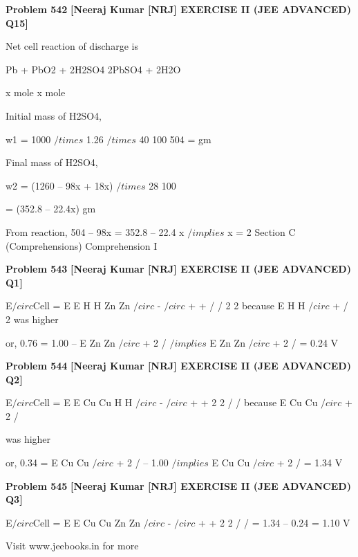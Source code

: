 \begin{problembox}
\textbf{Problem 542} \hfill \textbf{[Neeraj Kumar [NRJ] EXERCISE II (JEE ADVANCED) Q15]}
\label{q:ext-nrj_all_questions-542}

Net cell reaction of discharge is
 
 Pb + PbO2 + 2H2SO4 
 2PbSO4 + 2H2O
 
                          x mole                               x mole
 
 Initial mass of H2SO4,
 
  
 w1 = 1000 $/times$ 1.26 $/times$ 40
100
504
=
gm
 
 Final mass of H2SO4,
 
  
 w2 = (1260 -- 98x + 18x) $/times$ 28
100
 
  
      = (352.8 -- 22.4x) gm
 
 From reaction, 504 -- 98x = 352.8 -- 22.4 x $/implies$ x = 2
Section C (Comprehensions)
Comprehension I
\end{problembox}

\begin{problembox}
\textbf{Problem 543} \hfill \textbf{[Neeraj Kumar [NRJ] EXERCISE II (JEE ADVANCED) Q1]}
\label{q:ext-nrj_all_questions-543}

E$/circ$Cell = E
E
H
H
Zn
Zn
$/circ$
-
$/circ$
+
+
/
/
2
2
 because E H
H
$/circ$
+ /
2 was 
higher
 
 or, 0.76 = 1.00 -- E Zn
Zn
$/circ$
+
2 /
 $/implies$ E Zn
Zn
$/circ$
+
2 /
 = 0.24 V
\end{problembox}

\begin{problembox}
\textbf{Problem 544} \hfill \textbf{[Neeraj Kumar [NRJ] EXERCISE II (JEE ADVANCED) Q2]}
\label{q:ext-nrj_all_questions-544}

E$/circ$Cell = E
E
Cu
Cu
H
H
$/circ$
-
$/circ$
+
+
2
2
/
/
 because E Cu
Cu
$/circ$
+
2 /
 
was higher
 
 or, 0.34 = E Cu
Cu
$/circ$
+
2 /
 -- 1.00 $/implies$ E Cu
Cu
$/circ$
+
2 /
 = 1.34 V
\end{problembox}

\begin{problembox}
\textbf{Problem 545} \hfill \textbf{[Neeraj Kumar [NRJ] EXERCISE II (JEE ADVANCED) Q3]}
\label{q:ext-nrj_all_questions-545}

E$/circ$Cell = E
E
Cu
Cu
Zn
Zn
$/circ$
-
$/circ$
+
+
2
2
/
/
= 1.34 -- 0.24 = 1.10 V
 
 
Visit www.jeebooks.in for more
\end{problembox}

